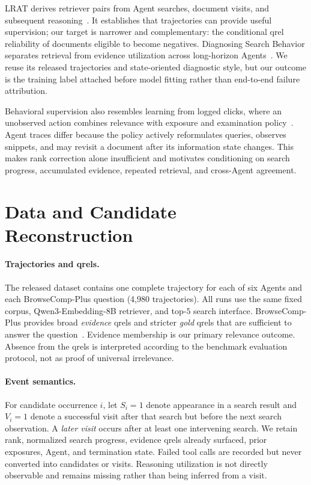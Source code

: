 LRAT derives retriever pairs from Agent searches, document visits, and subsequent reasoning~\cite{zhou2026lrat}. It establishes that trajectories can provide useful supervision; our target is narrower and complementary: the conditional qrel reliability of documents eligible to become negatives. Diagnosing Search Behavior separates retrieval from evidence utilization across long-horizon Agents~\cite{liu2026diagnosing}. We reuse its released trajectories and state-oriented diagnostic style, but our outcome is the training label attached before model fitting rather than end-to-end failure attribution.

Behavioral supervision also resembles learning from logged clicks, where an unobserved action combines relevance with exposure and examination policy~\cite{joachims2017unbiased}. Agent traces differ because the policy actively reformulates queries, observes snippets, and may revisit a document after its information state changes. This makes rank correction alone insufficient and motivates conditioning on search progress, accumulated evidence, repeated retrieval, and cross-Agent agreement.

\section{Data and Candidate Reconstruction}

\paragraph{Trajectories and qrels.}
The released dataset contains one complete trajectory for each of six Agents and each BrowseComp-Plus question (4,980 trajectories). All runs use the same fixed corpus, Qwen3-Embedding-8B retriever, and top-$5$ search interface. BrowseComp-Plus provides broad \emph{evidence} qrels and stricter \emph{gold} qrels that are sufficient to answer the question~\cite{chen2025browsecompplus}. Evidence membership is our primary relevance outcome. Absence from the qrels is interpreted according to the benchmark evaluation protocol, not as proof of universal irrelevance.

\paragraph{Event semantics.}
For candidate occurrence $i$, let $S_i=1$ denote appearance in a search result and $V_i=1$ denote a successful visit after that search but before the next search observation. A \emph{later visit} occurs after at least one intervening search. We retain rank, normalized search progress, evidence qrels already surfaced, prior exposures, Agent, and termination state. Failed tool calls are recorded but never converted into candidates or visits. Reasoning utilization is not directly observable and remains missing rather than being inferred from a visit.

